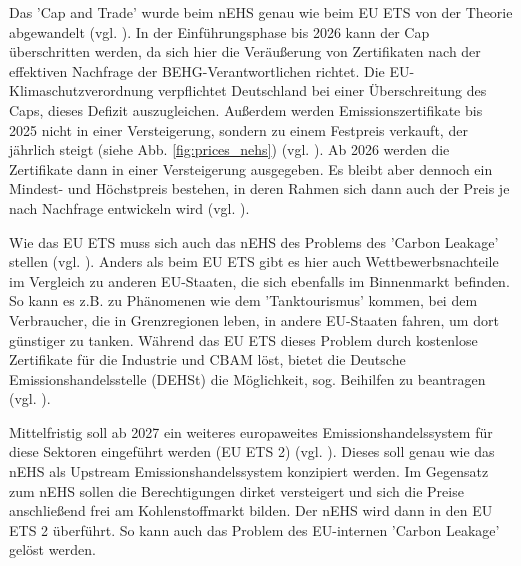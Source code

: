 Das 'Cap and Trade' wurde beim nEHS genau wie beim EU ETS von der Theorie abgewandelt (vgl. \cite{dehst.2023}).
In der Einführungsphase bis 2026 kann der Cap überschritten werden, da sich hier die Veräußerung von Zertifikaten nach der effektiven Nachfrage der BEHG-Verantwortlichen richtet.
Die EU-Klimaschutzverordnung verpflichtet Deutschland bei einer Überschreitung des Caps, dieses Defizit auszugleichen. 
Außerdem werden Emissionszertifikate bis 2025 nicht in einer Versteigerung, sondern zu einem Festpreis verkauft, der jährlich steigt (siehe Abb. \ref{fig:prices_nehs}) (vgl. \cite{dehst.2023}).
Ab 2026 werden die Zertifikate dann in einer Versteigerung ausgegeben.
Es bleibt aber dennoch ein Mindest- und Höchstpreis bestehen, in deren Rahmen sich dann auch der Preis je nach Nachfrage entwickeln wird (vgl. \cite{dehst.2023}).

Wie das EU ETS muss sich auch das nEHS des Problems des 'Carbon Leakage' stellen (vgl. \cite{dehst2.2023}). 
Anders als beim EU ETS gibt es hier auch Wettbewerbsnachteile im Vergleich zu anderen EU-Staaten, die sich ebenfalls im Binnenmarkt befinden.
So kann es z.B. zu Phänomenen wie dem 'Tanktourismus' kommen, bei dem Verbraucher, die in Grenzregionen leben, in andere EU-Staaten fahren, um dort günstiger zu tanken.
Während das EU ETS dieses Problem durch kostenlose Zertifikate für die Industrie und CBAM löst, bietet die Deutsche Emissionshandelsstelle (DEHSt) die Möglichkeit, sog. Beihilfen zu beantragen (vgl. \cite{dehst2.2023}).

Mittelfristig soll ab 2027 ein weiteres europaweites Emissionshandelssystem für diese Sektoren eingeführt werden (EU ETS 2) (vgl. \cite{ub.2023}).
Dieses soll genau wie das nEHS als Upstream Emissionshandelssystem konzipiert werden. Im Gegensatz zum nEHS sollen die Berechtigungen dirket versteigert und sich die Preise anschließend frei am Kohlenstoffmarkt bilden. 
Der nEHS wird dann in den EU ETS 2 überführt. So kann auch das Problem des EU-internen 'Carbon Leakage' gelöst werden.